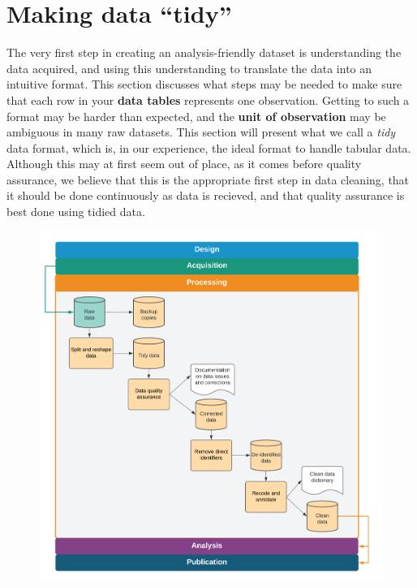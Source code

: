 \section{Making data ``tidy''}

The very first step in creating an analysis-friendly dataset
is understanding the data acquired,
and using this understanding to translate the data into an intuitive format.
This section discusses what steps may be needed to make sure that each row
in your \textbf{data tables}
represents one observation.
Getting to such a format may be harder than expected,
and the \textbf{unit of observation}
 may be ambiguous in many raw datasets.
This section will present what we call a \textit{tidy} data format,
which is, in our experience, the ideal format to handle tabular data.
Although this may at first seem out of place, as it comes before quality assurance,
we believe that this is the appropriate first step in data cleaning,
that it should be done continuously as data is recieved,
and that quality assurance is best done using tidied data.

\begin{fullwidth}
	\begin{figure}
		\centering
		\includegraphics[width=1.6\linewidth]{diagrams/Cleaning}
		\caption{}
		\label{fig:intro}
	\end{figure}
\end{fullwidth}

